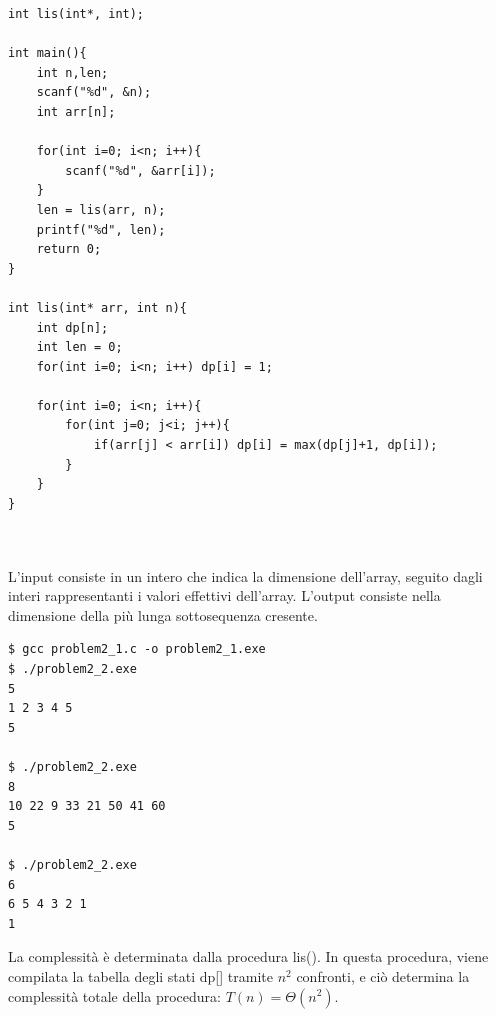 \documentclass{article}
\begin{document}
\newpage
\begin{lstlisting}
int lis(int*, int);

int main(){
    int n,len;
    scanf("%d", &n);
    int arr[n];
    
    for(int i=0; i<n; i++){
        scanf("%d", &arr[i]);
    }
    len = lis(arr, n);
    printf("%d", len);
    return 0;
}

int lis(int* arr, int n){
    int dp[n];
    int len = 0;
    for(int i=0; i<n; i++) dp[i] = 1;

    for(int i=0; i<n; i++){
        for(int j=0; j<i; j++){
            if(arr[j] < arr[i]) dp[i] = max(dp[j]+1, dp[i]); 
        }
    }
}



\end{lstlisting}
\noindent
L'input consiste in un intero che indica la dimensione dell'array, seguito dagli interi rappresentanti i valori effettivi dell'array. L'output consiste nella dimensione della più lunga sottosequenza cresente. 

\begin{commandline}
\begin{verbatim}
$ gcc problem2_1.c -o problem2_1.exe
$ ./problem2_2.exe 
5
1 2 3 4 5
5

$ ./problem2_2.exe 
8
10 22 9 33 21 50 41 60
5

$ ./problem2_2.exe
6
6 5 4 3 2 1
1
\end{verbatim}
\end{commandline}

\noindent
La complessità è determinata dalla procedura lis(). In questa procedura, viene compilata la tabella degli stati dp[] tramite $n^2$ confronti, e ciò determina la complessità totale della procedura: $T(n) = \Theta(n^2)$.
\end{document}
